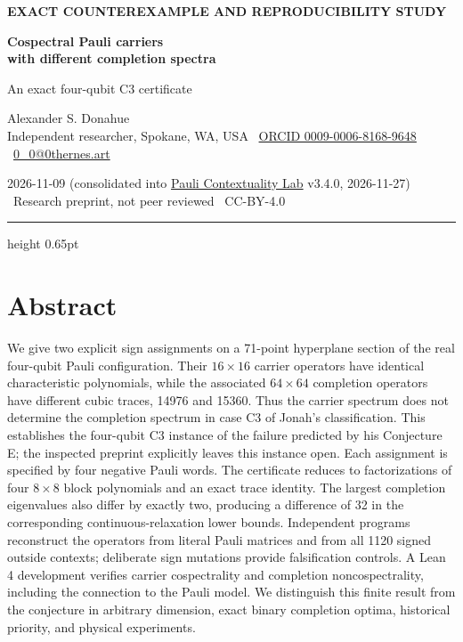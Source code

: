 \documentclass[11pt,letterpaper]{article}
\begin{document}
\thispagestyle{empty}
{\small\bfseries\color{Accent}EXACT COUNTEREXAMPLE AND REPRODUCIBILITY STUDY}\par
\vspace{0.6em}
{\fontsize{22}{25}\selectfont\bfseries Cospectral Pauli carriers\\with different completion spectra}\par
\vspace{0.25em}
{\large\color{Accent}An exact four-qubit C3 certificate}\par
\vspace{0.8em}
{\normalsize Alexander S. Donahue\\{\small\color{Muted}Independent researcher, Spokane, WA, USA \textbullet\ \href{https://orcid.org/0009-0006-8168-9648}{ORCID 0009-0006-8168-9648} \textbullet\ \href{mailto:0_0@0thernes.art}{0\_0@0thernes.art}}}\par
{\small\color{Muted}2026-11-09 (consolidated into \href{https://github.com/0thernes/pauli-contextuality-lab}{Pauli Contextuality Lab} v3.4.0, 2026-11-27) \textbullet\ Research preprint, not peer reviewed \textbullet\ CC-BY-4.0}\par
\vspace{0.6em}
{\color{Accent}\hrule height 0.65pt}
\vspace{0.5em}
\section{Abstract}\label{abstract}

We give two explicit sign assignments on a 71-point hyperplane section of the real four-qubit Pauli configuration. Their \(16\times16\) carrier operators have identical characteristic polynomials, while the associated \(64\times64\) completion operators have different cubic traces, 14976 and 15360. Thus the carrier spectrum does not determine the completion spectrum in case C3 of Jonah's classification. This establishes the four-qubit C3 instance of the failure predicted by his Conjecture E; the inspected preprint explicitly leaves this instance open. Each assignment is specified by four negative Pauli words. The certificate reduces to factorizations of four \(8\times8\) block polynomials and an exact trace identity. The largest completion eigenvalues also differ by exactly two, producing a difference of 32 in the corresponding continuous-relaxation lower bounds. Independent programs reconstruct the operators from literal Pauli matrices and from all 1120 signed outside contexts; deliberate sign mutations provide falsification controls. A Lean 4 development verifies carrier cospectrality and completion noncospectrality, including the connection to the Pauli model. We distinguish this finite result from the conjecture in arbitrary dimension, exact binary completion optima, historical priority, and physical experiments.
\end{document}
